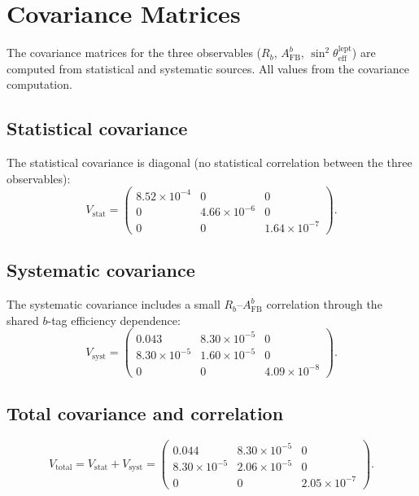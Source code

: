\documentclass[11pt,a4paper]{article}
\begin{document}
\section{Covariance Matrices}
\label{app:covariance}

The covariance matrices for the three observables ($R_b$, $A_\mathrm{FB}^b$,
$\sin^2\theta_\mathrm{eff}^\mathrm{lept}$) are computed from statistical and systematic
sources. All values from the covariance computation.

\subsection{Statistical covariance}

The statistical covariance is diagonal (no statistical correlation between the three
observables):
\begin{equation}
V_\mathrm{stat} = \begin{pmatrix}
8.52 \times 10^{-4} & 0 & 0 \\
0 & 4.66 \times 10^{-6} & 0 \\
0 & 0 & 1.64 \times 10^{-7}
\end{pmatrix}.
\label{eq:stat_cov}
\end{equation}

\subsection{Systematic covariance}

The systematic covariance includes a small $R_b$--$A_\mathrm{FB}^b$ correlation through
the shared $b$-tag efficiency dependence:
\begin{equation}
V_\mathrm{syst} = \begin{pmatrix}
0.043 & 8.30 \times 10^{-5} & 0 \\
8.30 \times 10^{-5} & 1.60 \times 10^{-5} & 0 \\
0 & 0 & 4.09 \times 10^{-8}
\end{pmatrix}.
\label{eq:syst_cov}
\end{equation}

\subsection{Total covariance and correlation}

\begin{equation}
V_\mathrm{total} = V_\mathrm{stat} + V_\mathrm{syst} = \begin{pmatrix}
0.044 & 8.30 \times 10^{-5} & 0 \\
8.30 \times 10^{-5} & 2.06 \times 10^{-5} & 0 \\
0 & 0 & 2.05 \times 10^{-7}
\end{pmatrix}.
\label{eq:total_cov}
\end{equation}
\end{document}
